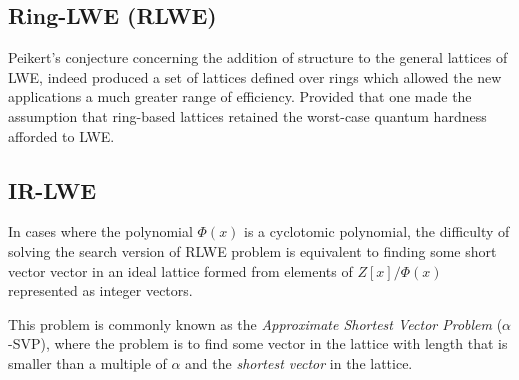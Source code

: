 \subsection{Ring-LWE (RLWE)}

Peikert's conjecture concerning the addition of structure to the general lattices of LWE, indeed produced a set of lattices defined over rings which allowed the new applications a much greater range of efficiency. Provided that one made the assumption that ring-based lattices retained the worst-case quantum hardness afforded to LWE. 




\subsection{IR-LWE}

In cases where the polynomial $\Phi(x)$ is a cyclotomic polynomial, the difficulty of solving the search version of RLWE problem is equivalent to finding some short vector vector in an ideal lattice formed from elements of $ Z[x]/\Phi (x) $ represented as integer vectors.

This problem is commonly known as the \emph{Approximate Shortest Vector Problem} ($\alpha$-SVP), where the problem is to find some vector in the lattice with length that is smaller than a multiple of $\alpha$ and the \emph{shortest vector} in the lattice. 

